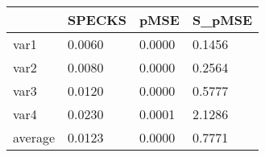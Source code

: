 \begin{tabular}{llll}
  \toprule 
 & SPECKS & pMSE & S\_pMSE \\ 
  \midrule 
var1 & 0.0060 & 0.0000 & 0.1456 \\ 
  var2 & 0.0080 & 0.0000 & 0.2564 \\ 
  var3 & 0.0120 & 0.0000 & 0.5777 \\ 
  var4 & 0.0230 & 0.0001 & 2.1286 \\ 
   \midrule 
average & 0.0123 & 0.0000 & 0.7771 \\ 
   \bottomrule 
\end{tabular}
